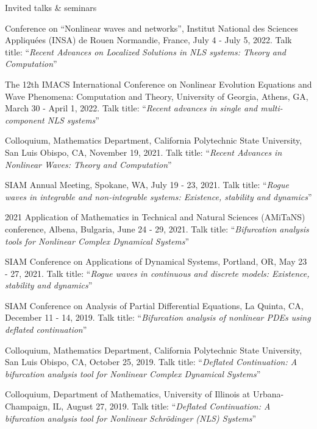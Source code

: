 \documentclass[10pt]{article} %
\begin{document}
\begin{section}{Invited talks \& seminars}
\begin{etaremune}
\item Conference on ``Nonlinear waves and networks'', Institut National des Sciences Appliqu\'ees %
(INSA) de Rouen Normandie, France, July 4 - July 5, 2022. %
Talk title: ``\textit{Recent Advances on Localized Solutions in NLS systems: Theory and Computation}''

\item The 12th IMACS International Conference on Nonlinear Evolution Equations and Wave Phenomena: Computation and Theory, %
        University of Georgia, Athens, GA, March 30 - April 1, 2022. 
        Talk title: ``\textit{Recent advances in single and multi-component NLS systems}''

\item Colloquium, Mathematics Department, California Polytechnic State University, San Luis Obispo, CA, November 19, 2021. 
Talk title: ``\textit{Recent Advances in Nonlinear Waves: Theory and Computation}'' 
        
\item SIAM Annual Meeting, Spokane, WA, July 19 - 23, 2021. Talk title: 
``\textit{Rogue waves in integrable and non-integrable systems: Existence, stability and dynamics}''

\item 2021 Application of Mathematics in Technical and Natural Sciences (AMiTaNS) conference, Albena, Bulgaria, June 24 - 29, 2021.
Talk title: ``\textit{Bifurcation analysis tools for Nonlinear Complex Dynamical Systems}''

\item SIAM Conference on Applications of Dynamical Systems, Portland, OR, May 23 - 27, 2021. Talk title: 
``\textit{Rogue waves in continuous and discrete models: Existence, stability and dynamics}''

\item SIAM Conference on Analysis of Partial Differential Equations, La Quinta, CA, December 11 - 14, 2019. 
Talk title: ``\textit{Bifurcation analysis of nonlinear PDEs using deflated continuation}''

\item Colloquium, Mathematics Department, California Polytechnic State University, San Luis Obispo, CA, October 25, 2019. 
Talk title: ``\textit{Deflated Continuation: A bifurcation analysis tool for Nonlinear Complex Dynamical Systems}''  

\item Colloquium, Department of Mathematics, University of Illinois at Urbana-Champaign, IL, August 27, 2019.
      Talk title: ``\textit{Deflated Continuation: A bifurcation analysis tool for Nonlinear Schr\"odinger (NLS) Systems}''


\end{etaremune}
\end{section}
\end{document}
